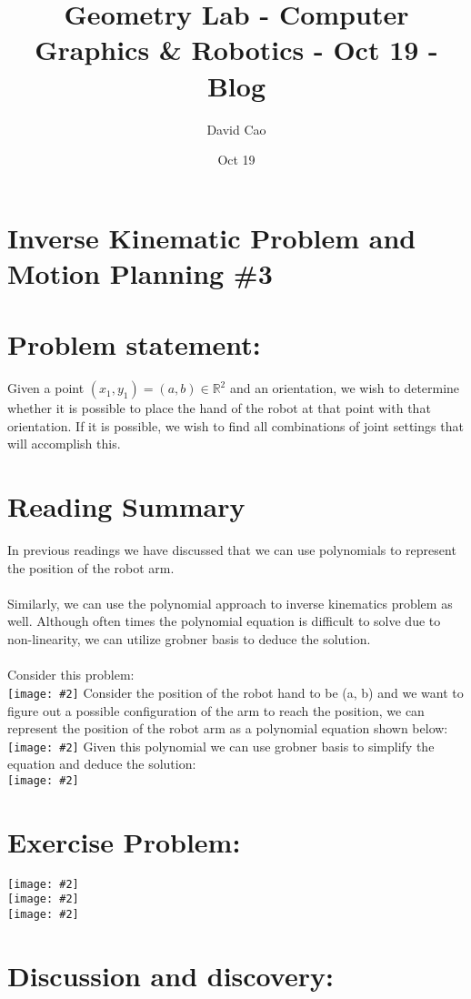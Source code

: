 \documentclass[11pt]{article}
\title{Geometry Lab - Computer Graphics \& Robotics - Oct 19 - Blog}
\author{David Cao}
\date{Oct 19}
\newcommand{\image}[2]{\texttt{[image: \#2]}}
\begin{document}
\maketitle

\section*{Inverse Kinematic Problem and Motion Planning \#3}
\section{Problem statement:}
Given a point $(x_1, y_1) = (a, b) \in \mathbb{R}^2$ and an orientation, we wish to determine whether it is possible to place the hand of the robot at that point with that orientation. If it is possible, we wish to find all combinations of joint settings that will accomplish this.

\section{Reading Summary}
In previous readings we have discussed that we can use polynomials to represent the position of the robot arm. \\
\\
Similarly, we can use the polynomial approach to inverse kinematics problem as well. Although often times the 
polynomial equation is difficult to solve due to non-linearity, we can utilize grobner basis to deduce the solution. \\
\\
Consider this problem: \\
\image{0.7}{img1}
Consider the position of the robot hand to be (a, b) and we want to figure out a possible configuration of the arm to reach the position, we can represent the position of the robot arm as a polynomial equation shown below: \\
\image{0.75}{img2}
Given this polynomial we can use grobner basis to simplify the equation and deduce the solution: \\
\image{0.6}{img3}

\section{Exercise Problem:}
\image{0.55}{img4} \\
\image{0.55}{img5} \\
\image{0.55}{img6}

\section{Discussion and discovery:}
\end{document}
